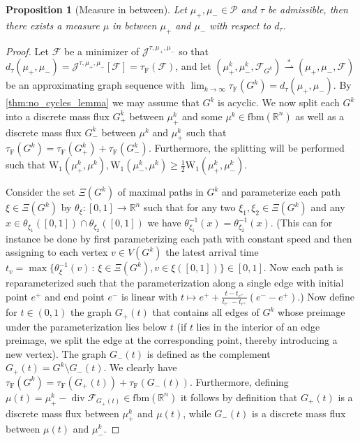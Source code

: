 \documentclass[10pt,a4paper,oneside,final]{article}
\newcommand{\R}{{\mathbb{R}}}
\DeclareMathOperator{\dv}{div}
\newcommand{\fbm}{{\mathrm{fbm}}}
\newcommand{\prob}{{\mathcal{P}}}
\newcommand{\weakstarto}{\stackrel{*}{\rightharpoonup}}
\newcommand{\Wd}[1]{\mathrm{W}_{#1}}
\newcommand{\Wdone}{\Wd{1}}
\newcommand{\flux}{{\mathcal{F}}}
\newcommand{\JEn}{{\mathcal{J}}}
\newcommand{\JEnXia}[1][\tau]{#1_{\mathrm{F}}}%
\newcommand{\dtau}{d_\tau}
\newcommand{\transportPath}{mass flux}
\numberwithin{equation}{section}
\theoremstyle{plain}
\newtheorem{proposition}[theorem]{Proposition}
\theoremstyle{definition}
\theoremstyle{remark}
\begin{document}
\begin{proposition}[Measure in between]
Let $\mu_+,\mu_-\in\prob$ and $\tau$ be admissible, then there exists a measure $\mu$ in between $\mu_+$ and $\mu_-$ with respect to $\dtau$.
\end{proposition}
\begin{proof}
Let $\flux$ be a minimizer of $\JEn^{\tau,\mu_+,\mu_-}$ so that $\dtau(\mu_+,\mu_-) = \JEn^{\tau,\mu_+,\mu_-}[\flux]=\JEnXia(\flux)$, and let $(\mu_+^k,\mu_-^k,\flux_{G^k})\weakstarto(\mu_+,\mu_-,\flux)$ be an approximating graph sequence with $\lim_{k\to\infty}\JEnXia(G^k)=\dtau(\mu_+,\mu_-)$.
By \cref{thm:no_cycles_lemma} we may assume that $G^k$ is acyclic.
We now split each $G^k$ into a discrete \transportPath{} $G_+^k$ between $\mu_+^k$ and some $\mu^k\in\fbm(\R^n)$ as well as a discrete \transportPath{} $G_-^k$ between $\mu^k$ and $\mu_+^k$ such that $\JEnXia(G^k)=\JEnXia(G_+^k)+\JEnXia(G_-^k)$.
Furthermore, the splitting will be performed such that $\Wdone(\mu_+^k,\mu^k),\Wdone(\mu_-^k,\mu^k)\geq\frac12\Wdone(\mu_+^k,\mu_-^k)$.

Consider the set $\Xi(G^k)$ of maximal paths in $G^k$ and parameterize each path $\xi\in\Xi(G^k)$ by $\theta_\xi:[0,1]\to\R^n$
such that for any two $\xi_1,\xi_2\in\Xi(G^k)$ and any $x\in\theta_{\xi_1}([0,1])\cap\theta_{\xi_2}([0,1])$ we have $\theta_{\xi_1}^{-1}(x)=\theta_{\xi_2}^{-1}(x)$.
(This can for instance be done by first parameterizing each path with constant speed
and then assigning to each vertex $v\in V(G^k)$ the latest arrival time $t_v=\max\{\theta_{\xi}^{-1}(v)\,:\,\xi\in\Xi(G^k),v\in\xi([0,1])\}\in[0,1]$.
Now each path is reparameterized such that the parameterization along a single edge with initial point $e^+$ and end point $e^-$ is linear with $t\mapsto e^++\frac{t-t_{e^+}}{t_{e^-}-t_{e^+}}(e^--e^+)$.)
Now define for $t\in(0,1)$ the graph $G_+(t)$ that contains all edges of $G^k$ whose preimage under the parameterization lies below $t$
(if $t$ lies in the interior of an edge preimage, we split the edge at the corresponding point, thereby introducing a new vertex).
The graph $G_-(t)$ is defined as the complement $G_+(t)=G^k\setminus G_-(t)$.
% 
We clearly have $\JEnXia(G^k)=\JEnXia(G_+(t))+\JEnXia(G_-(t))$.
Furthermore, defining $\mu(t)=\mu_+^k-\dv\flux_{G_+(t)}\in\fbm(\R^n)$ it follows by definition that $G_+(t)$ is a discrete \transportPath{} between $\mu_+^k$ and $\mu(t)$, while $G_-(t)$ is a discrete \transportPath{} between $\mu(t)$ and $\mu_-^k$.


\end{proof}
\end{document}
